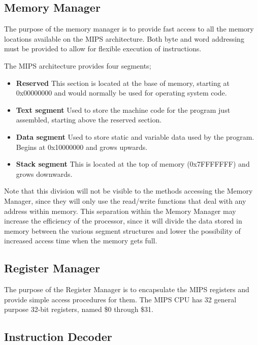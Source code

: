 \documentclass[12pt]{report}
\begin{document}
\subsection{Memory Manager}

The purpose of the memory manager is to provide fast access to all the memory locations available on the MIPS architecture. Both byte and word addressing must be provided to allow for flexible execution of instructions.

The MIPS architecture provides four segments;

\begin{itemize}

\item \textbf{Reserved} This section is located at the base of memory, starting at 0x00000000 and would normally be used for operating system code.

\item \textbf{Text segment} Used to store the machine code for the program just assembled, starting above the reserved section.

\item \textbf{Data segment} Used to store static and variable data used by the program.  Begins at 0x10000000 and grows upwards.

\item \textbf{Stack segment} This is located at the top of memory (0x7FFFFFFF) and grows downwards.

\end{itemize}

Note that this division will not be visible to the methods accessing the Memory Manager, since they will only use the read/write functions that deal with any address within memory. This separation within the Memory Manager may increase the efficiency of the processor, since it will divide the data stored in memory between the various segment structures and lower the possibility of increased access time when the memory gets full.


\subsection{Register Manager}

The purpose of the Register Manager is to encapsulate the MIPS registers and provide simple access procedures for them. The MIPS CPU has 32 general purpose 32-bit registers, named \$0 through \$31.

\subsection{Instruction Decoder}
\end{document}

